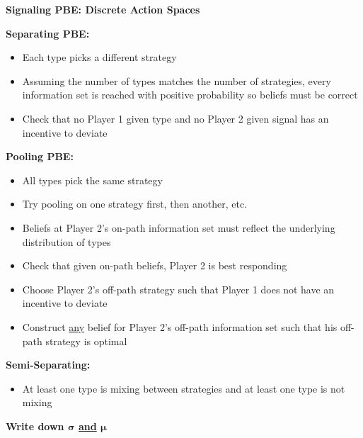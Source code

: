 \documentclass{report}
\newcommand{\FlowerSmall}{\mbox{\raisebox{-1pt}{\small\EightFlowerPetalRemoved}}} %
\begin{document}
\newpage
\begin{mdframed}
	\medskip
	\begin{center} \textbf{{\large Signaling PBE: Discrete Action Spaces}} \end{center}
	\bigskip
	\textbf{Separating PBE:}
	\begin{itemize}[label=\FlowerSmall]
		\item Each type picks a different strategy
		\item Assuming the number of types matches the number of strategies, every information set is reached with positive probability so beliefs must be correct
		\item Check that no Player 1 given type and no Player 2 given signal has an incentive to deviate
	\end{itemize}
	\textbf{Pooling PBE:}
	\begin{itemize}[label=\FlowerSmall]
		\item All types pick the same strategy
		\item Try pooling on one strategy first, then another, etc.
		\item Beliefs at Player 2's on-path information set must reflect the underlying distribution of types
		\item Check that given on-path beliefs, Player 2 is best responding
		\item Choose Player 2's off-path strategy such that Player 1 does not have an incentive to deviate
		\item Construct \underline{any} belief for Player 2's off-path information set such that his off-path strategy is optimal
	\end{itemize}
	\textbf{Semi-Separating:}
	\begin{itemize}[label=\FlowerSmall]
		\item At least one type is mixing between strategies and at least one type is not mixing
	\end{itemize}
	\textbf{Write down $\boldsymbol{\sigma}$ \underline{and} $\boldsymbol{\mu}$}
	\smallskip
\end{mdframed}
\bigskip
\end{document}

